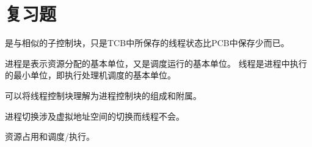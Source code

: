 
\section{复习题}
{
    \begin{reviewc}
        是与相似的子控制块，只是TCB中所保存的线程状态比PCB中保存少而已。

        进程是表示资源分配的基本单位，又是调度运行的基本单位。
        线程是进程中执行的最小单位，即执行处理机调度的基本单位。

        可以将线程控制块理解为进程控制块的组成和附属。
    \end{reviewc}

    \begin{reviewc}
        进程切换涉及虚拟地址空间的切换而线程不会。
    \end{reviewc}

    \begin{reviewc}
        资源占用和调度/执行。
    \end{reviewc}

    \begin{reviewc}

    \end{reviewc}
}
